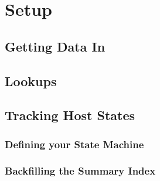 \section{Setup}
\subsection{Getting Data In}
\subsection{Lookups}
\subsection{Tracking Host States}
\subsubsection{Defining your State Machine}
\subsubsection{Backfilling the Summary Index}
